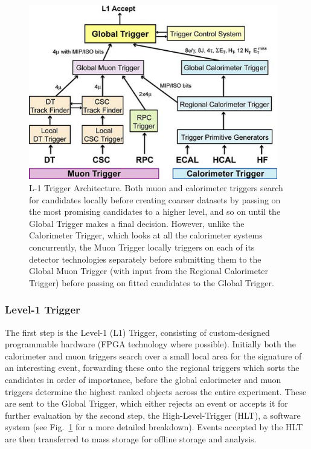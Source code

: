 
\begin{figure}[htbp]
\begin{center}
\includegraphics[width=0.97\textwidth]{figs/cms/trigger.png}
\caption{L-1 Trigger Architecture. Both muon and calorimeter triggers search for candidates locally before creating coarser datasets by passing on the most promising candidates to a higher level, and so on until the Global Trigger makes a final decision. However, unlike the Calorimeter Trigger, which looks at all the calorimeter systems concurrently, the Muon Trigger locally triggers on each of its detector technologies separately before submitting them to the Global Muon Trigger (with input from the Regional Calorimeter Trigger) before passing on fitted candidates to the Global Trigger.}
\label{fig:trigger}
\end{center}
\end{figure}

\subsubsection{Level-1 Trigger}
The first step is the Level-1 (L1) Trigger, consisting of custom-designed programmable hardware (FPGA technology where possible). 
Initially both the calorimeter and muon triggers search over a small local area for the signature of an interesting event, forwarding these onto the regional triggers which sorts the candidates in order of importance, before the global calorimeter and muon triggers determine the highest ranked objects across the entire experiment. 
These are sent to the Global Trigger, which either rejects an event or accepts it for further evaluation by the second step, the High-Level-Trigger (HLT), a software system (see Fig.~\ref{fig:trigger} for a more detailed breakdown). 
Events accepted by the HLT are then transferred to mass storage for offline storage and analysis\cite{oldcms}. 

